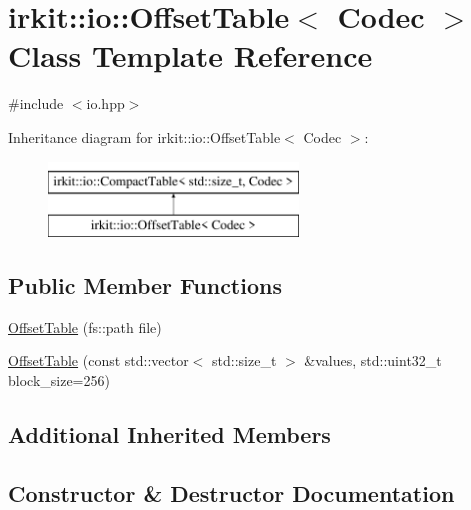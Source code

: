 \hypertarget{classirkit_1_1io_1_1OffsetTable}{}\section{irkit\+:\+:io\+:\+:Offset\+Table$<$ Codec $>$ Class Template Reference}
\label{classirkit_1_1io_1_1OffsetTable}


{\ttfamily \#include $<$io.\+hpp$>$}

Inheritance diagram for irkit\+:\+:io\+:\+:Offset\+Table$<$ Codec $>$\+:\begin{figure}[H]
\begin{center}
\leavevmode
\includegraphics[height=2.000000cm]{classirkit_1_1io_1_1OffsetTable}
\end{center}
\end{figure}
\subsection*{Public Member Functions}
\begin{DoxyCompactItemize}
\item 
\mbox{\hyperlink{classirkit_1_1io_1_1OffsetTable_aa933b6b569685efcd7cc1fdc8b7fc082}{Offset\+Table}} (fs\+::path file)
\item 
\mbox{\hyperlink{classirkit_1_1io_1_1OffsetTable_a7446f4c5e47b014f914225691dffa44a}{Offset\+Table}} (const std\+::vector$<$ std\+::size\+\_\+t $>$ \&values, std\+::uint32\+\_\+t block\+\_\+size=256)
\end{DoxyCompactItemize}
\subsection*{Additional Inherited Members}


\subsection{Constructor \& Destructor Documentation}
\mbox{\label{classirkit_1_1io_1_1OffsetTable_aa933b6b569685efcd7cc1fdc8b7fc082}} 
